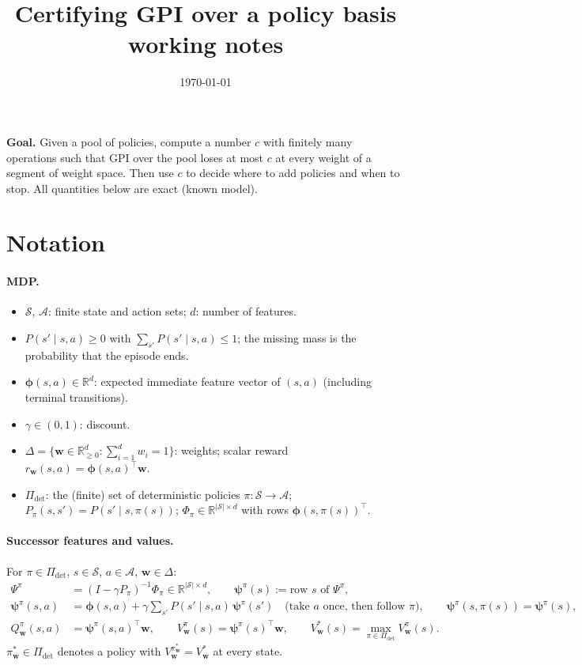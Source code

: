\documentclass[11pt]{article}
\title{Certifying GPI over a policy basis\\[2pt]\large working notes}
\author{}
\date{\today}
\newcommand{\vphi}{\bm{\phi}}
\newcommand{\vpsi}{\bm{\psi}}
\newcommand{\w}{\mathbf{w}}
\newcommand{\cS}{\mathcal S}
\newcommand{\cA}{\mathcal A}
\newcommand{\R}{\mathbb R}
\theoremstyle{definition}
\begin{document}
\maketitle

\noindent\textbf{Goal.} Given a pool of policies, compute a number $c$ with finitely many operations such that GPI
over the pool loses at most $c$ at every weight of a segment of weight space. Then use $c$ to decide where to add
policies and when to stop. All quantities below are exact (known model).

\section{Notation}

\paragraph{MDP.}
\begin{itemize}
\item $\cS$, $\cA$: finite state and action sets; $d$: number of features.
\item $P(s'\mid s,a)\ge0$ with $\sum_{s'}P(s'\mid s,a)\le1$; the missing mass is the probability that the episode ends.
\item $\vphi(s,a)\in\R^d$: expected immediate feature vector of $(s,a)$ (including terminal transitions).
\item $\gamma\in(0,1)$: discount.
\item $\Delta=\{\w\in\R^d_{\ge0}:\sum_{i=1}^d w_i=1\}$: weights; scalar reward $r_\w(s,a)=\vphi(s,a)^\top\w$.
\item $\Pi_{\det}$: the (finite) set of deterministic policies $\pi:\cS\to\cA$;
$P_\pi(s,s')=P(s'\mid s,\pi(s))$; $\Phi_\pi\in\R^{|\cS|\times d}$ with rows $\vphi(s,\pi(s))^\top$.
\end{itemize}

\paragraph{Successor features and values.} For $\pi\in\Pi_{\det}$, $s\in\cS$, $a\in\cA$, $\w\in\Delta$:
\begin{align}
\Psi^\pi&=(I-\gamma P_\pi)^{-1}\Phi_\pi\in\R^{|\cS|\times d},\qquad \vpsi^\pi(s):=\text{row $s$ of }\Psi^\pi,\label{eq:sf}\\
\vpsi^\pi(s,a)&=\vphi(s,a)+\gamma\textstyle\sum_{s'}P(s'\mid s,a)\,\vpsi^\pi(s')
\quad\text{(take $a$ once, then follow $\pi$)},\qquad \vpsi^\pi(s,\pi(s))=\vpsi^\pi(s),\label{eq:sfa}\\
Q^\pi_\w(s,a)&=\vpsi^\pi(s,a)^\top\w,\qquad V^\pi_\w(s)=\vpsi^\pi(s)^\top\w,\qquad
V^*_\w(s)=\max_{\pi\in\Pi_{\det}}V^\pi_\w(s).\label{eq:values}
\end{align}
$\pi^*_\w\in\Pi_{\det}$ denotes a policy with $V^{\pi^*_\w}_\w=V^*_\w$ at every state.
\end{document}
